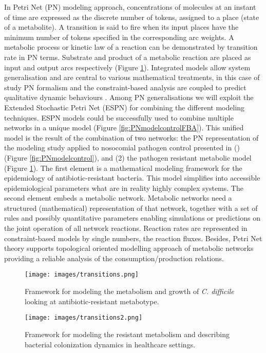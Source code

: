 \documentclass{article}
\begin{document}
In Petri Net (PN) modeling approach, concentrations of molecules at an instant of time are expressed as the discrete number of tokens, assigned to a place (state of a metabolite). A transition is said to fire when its input places have the minimum number of tokens specified in the corresponding arc weights. A metabolic process or kinetic law of a reaction can be demonstrated by transition rate in PN terms. Substrate and product of a metabolic reaction are placed as input and output arcs respectively (Figure \ref{fig:frmwrk}). Integrated models allow system generalisation and are central to various mathematical treatments, in this case of study PN formalism and the constraint-based analysis are coupled to predict qualitative dynamic behaviours \cite{pernice}. Among PN generalisations we will exploit the Extended Stochastic Petri Net (ESPN) for combining the different modeling techniques. ESPN models could be successfully used to combine multiple networks in a unique model (Figure \ref{fig:PNmodelcontrolFBA}). This unified model is the result of the combination of two networks: the PN representation of the modeling study applied to nosocomial pathogen control presented in (\cite{Smith}) (Figure \ref{fig:PNmodelcontrol}), and (2) the pathogen resistant metabolic model (Figure \ref{fig:frmwrk}). The first element is a mathematical modeling framework for the epidemiology of antibiotic-resistant bacteria. This model simplifies into accessible epidemiological parameters what are in reality highly complex systems. The second element embeds a metabolic network. Metabolic networks need a structured (mathematical) representation of that network, together with a set of rules and possibly quantitative parameters enabling simulations or predictions on the joint operation of all network reactions. Reaction rates are represented in constraint-based models by single numbers, the reaction fluxes. Besides, Petri Net theory supports topological oriented modelling approach of metabolic networks providing a reliable analysis of the consumption/production relations.

\begin{figure}
\centering
\texttt{[image: images/transitions.png]}
\caption{\label{fig:frmwrk} Framework for modeling the metabolism and growth of {\it C. difficile} looking at antibiotic-resistant metabotype.}
\end{figure}

\begin{figure}
\centering
\texttt{[image: images/transitions2.png]}
\caption{\label{fig:frmwrk2} Framework for modeling the resistant metabolism and describing bacterial colonization dynamics in healthcare settings.}
\end{figure}
\end{document}
